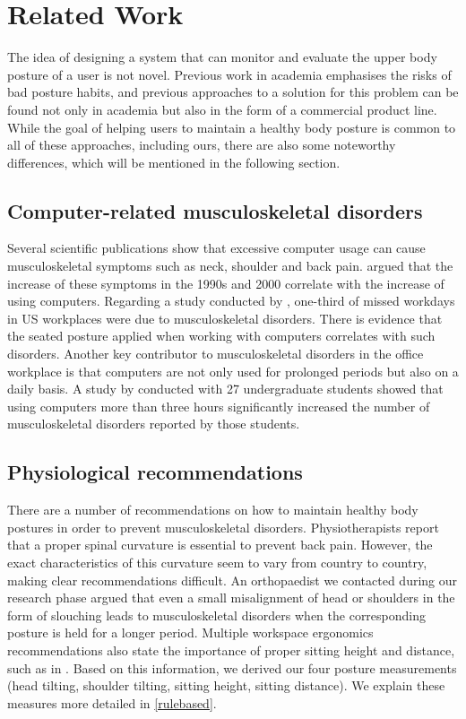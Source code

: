 
\section{Related Work} %
\label{related-work}
The idea of designing a system that can monitor and evaluate the upper body posture of a user is not novel. Previous work in academia emphasises the risks of bad posture habits, and previous approaches to a solution for this problem can be found not only in academia but also in the form of a commercial product line. While the goal of helping users to maintain a healthy body posture is common to all of these approaches, including ours, there are also some noteworthy differences, which will be mentioned in the following section. 
\subsection{Computer-related musculoskeletal disorders}
Several scientific publications show that excessive computer usage can cause musculoskeletal symptoms such as neck, shoulder and back pain. \citeauthor{hakala2006frequent} \cite{hakala2006frequent} argued that the increase of these symptoms in the 1990s and 2000 correlate with the increase of using computers.
Regarding a study conducted by \citeauthor{fang2007workers} \cite{fang2007workers}, one-third of missed workdays in US workplaces were due to musculoskeletal disorders. There is evidence that the seated posture applied when working with computers correlates with such disorders\cite{gerr2004epidemiology}. Another key contributor to musculoskeletal disorders in the office workplace is that computers are not only used for prolonged periods but also on a daily basis\cite{gerr2004epidemiology,chang2007daily}. A study by \citeauthor{chang2007daily} conducted with 27 undergraduate students  showed that using computers more than three hours significantly increased the number of musculoskeletal disorders reported by those students.

\subsection{Physiological recommendations}
There are a number of recommendations on how to maintain healthy body postures in order to prevent musculoskeletal disorders. Physiotherapists report that a proper spinal curvature is essential to prevent back pain. However, the exact characteristics of this curvature seem to vary from country to country, making clear recommendations difficult\cite{o2012physiotherapists}. An orthopaedist we contacted during our research phase argued that even a small misalignment of head or shoulders in the form of slouching leads to musculoskeletal disorders when the corresponding posture is held for a longer period. Multiple workspace ergonomics recommendations also state the importance of proper sitting height and distance, such as in \cite{website:muckenthaler_ergonomie}. Based on this information, we derived our four posture measurements (head tilting, shoulder tilting, sitting height, sitting distance). We explain these measures more detailed in \autoref{rulebased}.


